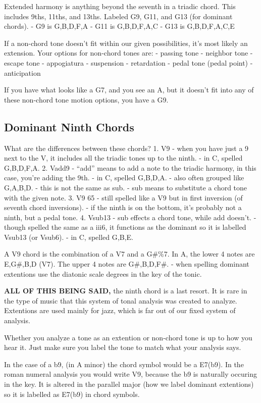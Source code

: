 \documentclass{book}
\begin{document}
Extended harmony is anything beyond the seventh in a triadic chord. This
includes 9ths, 11ths, and 13ths. Labeled G9, G11, and G13 (for dominant
chords). - G9 is G,B,D,F,A - G11 is G,B,D,F,A,C - G13 is G,B,D,F,A,C,E

If a non-chord tone doesn't fit within our given possibilities, it's most
likely an extension. Your options for non-chord tones are: - passing tone -
neighbor tone - escape tone - appogiatura - suspension - retardation - pedal
tone (pedal point) - anticipation

If you have what looks like a G7, and you see an A, but it doesn't fit into
any of these non-chord tone motion options, you have a G9.

\hypertarget{dominant-ninth-chords}{%
\subsection{Dominant Ninth Chords}\label{dominant-ninth-chords}}

What are the differences between these chords? 1. V9 - when you have just a 9
next to the V, it includes all the triadic tones up to the ninth. - in C,
spelled G,B,D,F,A. 2. Vadd9 - ``add'' means to add a note to the triadic
harmony, in this case, you're adding the 9th. - in C, spelled G,B,D,A. - also
often grouped like G,A,B,D. - this is not the same as sub. - sub means to
substitute a chord tone with the given note. 3. V9 65 - still spelled like a
V9 but in first inversion (of seventh chord inversions). - if the ninth is on
the bottom, it's probably not a ninth, but a pedal tone. 4. Vsub13 - sub
effects a chord tone, while add doesn't. - though spelled the same as a iii6,
it functions as the dominant so it is labelled Vsub13 (or Vsub6). - in C,
spelled G,B,E.

A V9 chord is the combination of a V7 and a G\#\%7. In A, the lower 4 notes
are E,G\#,B,D (V7). The upper 4 notes are G\#,B,D,F\#. - when spelling
dominant extentions use the diatonic scale degrees in the key of the tonic.

\textbf{ALL OF THIS BEING SAID,} the ninth chord is a last resort. It is rare
in the type of music that this system of tonal analysis was created to
analyze. Extentions are used mainly for jazz, which is far out of our fixed
system of analysis.

Whether you analyze a tone as an extention or non-chord tone is up to how you
hear it. Just make sure you label the tone to match what your analysis says.

In the case of a b9, (in A minor) the chord symbol would be a E7(b9). In the
roman numeral analysis you would write V9, because the b9 is naturally
occuring in the key. It is altered in the parallel major (how we label
dominant extentions) so it is labelled as E7(b9) in chord symbols.
\end{document}
